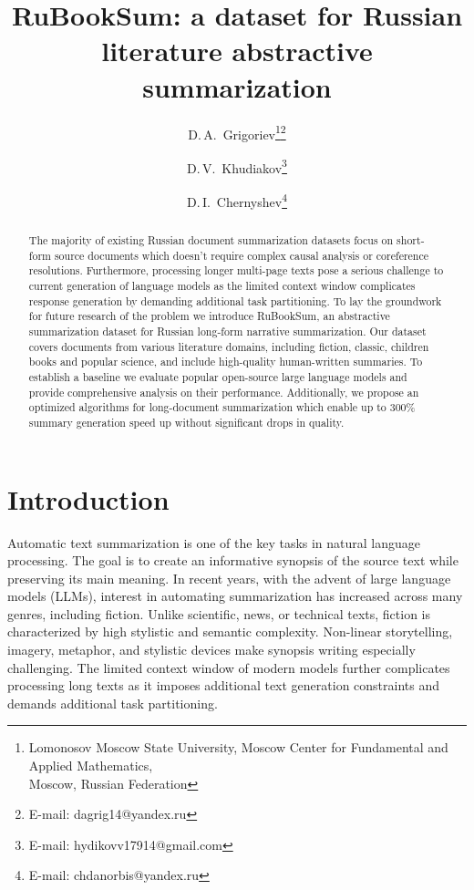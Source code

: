 \documentclass{superfri}
\begin{document}
\raggedbottom
\author{D.\,A.~Grigoriev\footnote{\label{msu}Lomonosov Moscow State University, Moscow Center for Fundamental and Applied Mathematics, \\ Moscow, Russian Federation}\footnote{E-mail: dagrig14@yandex.ru} \and D.\,V.~Khudiakov\footnote{E-mail: hydikovv17914@gmail.com} \and D.\,I.~Chernyshev\footnote{E-mail: chdanorbis@yandex.ru}}

\title{RuBookSum: a dataset for Russian literature abstractive summarization}

\maketitle{}

\begin{abstract}
The majority of existing Russian document summarization datasets focus on short-form source documents which doesn't require complex causal analysis or 
coreference resolutions. Furthermore, processing longer multi-page texts pose a serious challenge to current generation of language models as the 
limited context window complicates response generation by demanding additional task partitioning. 
To lay the groundwork for future research of the problem we introduce RuBookSum, an abstractive summarization dataset for Russian long-form narrative summarization. 
Our dataset covers documents from various literature domains, including fiction, classic, children books and popular science, and include high-quality human-written 
summaries. To establish a baseline we evaluate popular open-source large language models and provide comprehensive analysis on their performance. Additionally, 
we propose an optimized algorithms for long-document summarization which enable up to 300\% summary generation speed up without significant drops in quality.

\end{abstract}




\section*{Introduction}
Automatic text summarization is one of the key tasks in natural language processing. The goal is to create an informative synopsis of the source text while preserving its main meaning.
In recent years, with the advent of large language models (LLMs), interest in automating summarization has increased across many genres, including fiction.
Unlike scientific, news, or technical texts, fiction is characterized by high stylistic and semantic complexity.
Non-linear storytelling, imagery, metaphor, and stylistic devices make synopsis writing especially challenging.
The limited context window of modern models further complicates processing long texts as it imposes additional text generation constraints and demands additional task partitioning.
\end{document}
